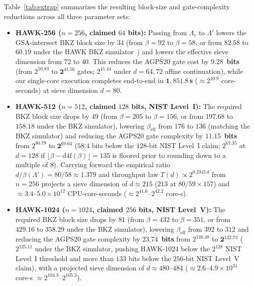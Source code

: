 \documentclass[11pt,a4paper]{article}
\theoremstyle{definition}
\newcommand{\Lt}{\Lambda_\tau}
\newcommand{\Lp}{\Lambda'}
\begin{document}
Table~\ref{tab:extrap} summarizes the resulting block-size and gate-complexity reductions across all three parameter sets:
\begin{itemize}[leftmargin=*]
\item \textbf{HAWK-256 ($n=256$, claimed $64$ bits):} Passing from $\Lt$ to $\Lp$ lowers the GSA-intersect BKZ block size by $34$ (from $\beta=92$ to $\beta=58$, or from $82.58$ to $60.19$ under the HAWK BKZ simulator~\cite{DPPvW22}) and lowers the effective sieve dimension from $72$ to $40$. This reduces the AGPS20 gate cost by $\mathbf{9.28}$~\textbf{bits} (from $2^{50.83}$ to $\mathbf{2^{41.56}}$ gates; $2^{41.44}$ under $d=64,72$ affine continuation), while our single-core execution completes end-to-end in $\mathbf{1{,}851.8}$\,\textbf{s} ($\approx 2^{10.9}$ core-seconds) at sieve dimension $d=80$.
\item \textbf{HAWK-512 ($n=512$, claimed $128$ bits, NIST Level~I):} The required BKZ block size drops by $49$ (from $\beta=205$ to $\beta=156$, or from $197.68$ to $158.18$ under the BKZ simulator), lowering $\beta_{\mathrm{eff}}$ from $176$ to $136$ (matching the BKZ simulator) and reducing the AGPS20 gate complexity by $\mathbf{11.15}$~\textbf{bits} from $2^{80.79}$ to $\mathbf{2^{69.64}}$ ($58.4$ bits below the $128$-bit NIST Level~I claim; $2^{67.35}$ at $d=128$ if $\lfloor\beta - \mathrm{d4f}(\beta)\rfloor = 135$ is floored prior to rounding down to a multiple of $8$). Carrying forward the empirical ratio $d / \beta(\Lp) = 80 / 58 \approx 1.379$ and throughput law $T(d) \propto 2^{0.2345\,d}$ from $n=256$ projects a sieve dimension of $d \approx 215$ ($213$ at $80/59 \times 157$) and $\approx 3.4\text{--}5.0 \times 10^{12}$ CPU-core-seconds ($\approx 2^{41.6}\text{--}2^{42.2}$ core-s).
\item \textbf{HAWK-1024 ($n=1024$, claimed $256$ bits, NIST Level~V):} The required BKZ block size drops by $81$ (from $\beta=432$ to $\beta=351$, or from $429.16$ to $358.29$ under the BKZ simulator), lowering $\beta_{\mathrm{eff}}$ from $392$ to $312$ and reducing the AGPS20 gate complexity by $\mathbf{23.74}$~\textbf{bits} from $2^{146.48}$ to $\mathbf{2^{122.73}}$ ($2^{125.11}$ under the BKZ simulator, pushing HAWK-1024 below the $2^{128}$ NIST Level~I threshold and more than $133$ bits below the $256$-bit NIST Level~V claim), with a projected sieve dimension of $d \approx 480\text{--}484$ ($\approx 2.6\text{--}4.9 \times 10^{31}$ core-s $\approx 2^{104.3}\text{--}2^{105.3}$).
\end{itemize}
\end{document}
